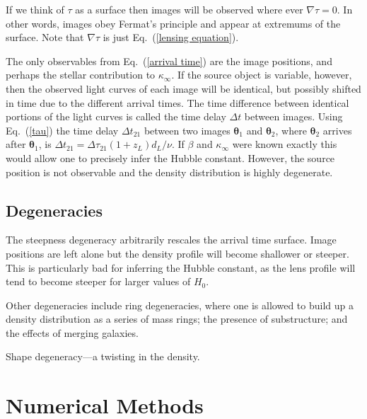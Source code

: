\documentclass[onecolumn,galley]{mn2e}
\newcommand{\eqnref}[1] {Eq.~(\ref{#1})}
\renewcommand{\vec}[1]{\ensuremath{\boldsymbol{#1}}}
\begin{document}
If we think of $\tau$ as a surface then images will be observed where ever
$\nabla \tau = 0$. In other words, images obey Fermat's principle and appear at
extremums of the surface. Note that $\nabla \tau$ is just \eqnref{lensing equation}.

The only observables from \eqnref{arrival time} are the image positions, and
perhaps the stellar contribution to $\kappa_\infty$.  If the source object is
variable, however, then the observed light curves of each image will be
identical, but possibly shifted in time due to the different arrival times.
The time difference between identical portions of the light curves is called
the time delay $\Delta t$ between images.  Using \eqnref{tau} the time delay
$\Delta t_{21}$ between two images $\vec\theta_1$ and $\vec\theta_2$, where $\vec\theta_2$
arrives after $\vec\theta_1$, is $\Delta t_{21} = \Delta \tau_{21}(1+z_L)d_L /
\nu$. If $\beta$ and $\kappa_\infty$ were known exactly this would allow one
to precisely infer the Hubble constant. However, the source position is not
observable and the density distribution is highly degenerate.

\subsection{Degeneracies} %

The steepness degeneracy arbitrarily rescales the arrival time surface. Image
positions are left alone but the density profile will become shallower or
steeper. This is particularly bad for inferring the Hubble constant, as the
lens profile will tend to become steeper for larger values of $H_0$.

Other degeneracies include ring degeneracies, where one is allowed to build
up a density distribution as a series of mass rings; the presence of substructure;
and the effects of merging galaxies. 

Shape degeneracy---a twisting in the density.

\section{Numerical Methods} 
\end{document}
